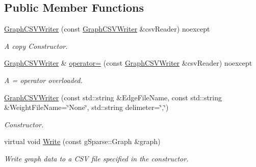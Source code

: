 \subsection*{Public Member Functions}
\begin{DoxyCompactItemize}
\item 
\mbox{\label{classg_sparse_1_1_graph_c_s_v_writer_a72f27412732680150f6706f456db93c4}} 
\mbox{\hyperlink{classg_sparse_1_1_graph_c_s_v_writer_a72f27412732680150f6706f456db93c4}{Graph\+C\+S\+V\+Writer}} (const \mbox{\hyperlink{classg_sparse_1_1_graph_c_s_v_writer}{Graph\+C\+S\+V\+Writer}} \&csv\+Reader) noexcept
\begin{DoxyCompactList}\small\item\em A copy Constructor. \end{DoxyCompactList}\item 
\mbox{\label{classg_sparse_1_1_graph_c_s_v_writer_ab0b254d0861f2bb0edc789e6f080a912}} 
\mbox{\hyperlink{classg_sparse_1_1_graph_c_s_v_writer}{Graph\+C\+S\+V\+Writer}} \& \mbox{\hyperlink{classg_sparse_1_1_graph_c_s_v_writer_ab0b254d0861f2bb0edc789e6f080a912}{operator=}} (const \mbox{\hyperlink{classg_sparse_1_1_graph_c_s_v_writer}{Graph\+C\+S\+V\+Writer}} \&csv\+Reader) noexcept
\begin{DoxyCompactList}\small\item\em A = operator overloaded. \end{DoxyCompactList}\item 
\mbox{\hyperlink{classg_sparse_1_1_graph_c_s_v_writer_aa89f61ce6e6affcbc418f892f0110de9}{Graph\+C\+S\+V\+Writer}} (const std\+::string \&Edge\+File\+Name, const std\+::string \&Weight\+File\+Name=\char`\"{}None\char`\"{}, std\+::string delimeter=\char`\"{},\char`\"{})
\begin{DoxyCompactList}\small\item\em Constructor. \end{DoxyCompactList}\item 
virtual void \mbox{\hyperlink{classg_sparse_1_1_graph_c_s_v_writer_a588c4bf47ee70bb72079ac7d6f843c2d}{Write}} (const g\+Sparse\+::\+Graph \&graph)
\begin{DoxyCompactList}\small\item\em Write graph data to a C\+SV file specified in the constructor. \end{DoxyCompactList}\item 

\end{DoxyCompactItemize}
